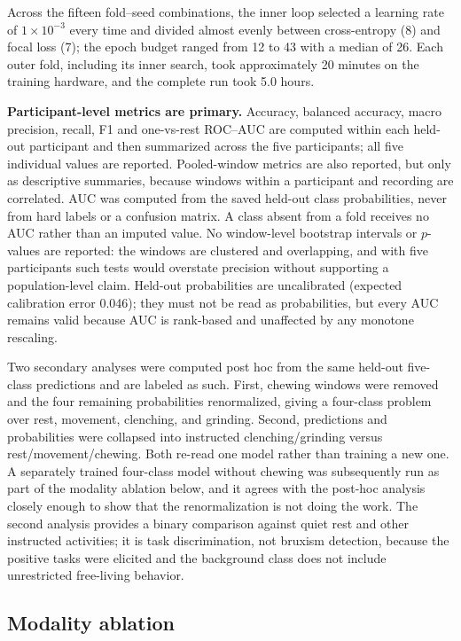 \documentclass[pdflatex,sn-nature,iicol]{sn-jnl}
\begin{document}
Across the fifteen fold--seed combinations, the inner loop selected a learning rate of $1\times10^{-3}$ every time and divided almost evenly between cross-entropy (8) and focal loss (7); the epoch budget ranged from 12 to 43 with a median of 26. Each outer fold, including its inner search, took approximately 20 minutes on the training hardware, and the complete run took 5.0 hours.

\textbf{Participant-level metrics are primary.} Accuracy, balanced accuracy, macro precision, recall, F1 and one-vs-rest ROC--AUC are computed within each held-out participant and then summarized across the five participants; all five individual values are reported. Pooled-window metrics are also reported, but only as descriptive summaries, because windows within a participant and recording are correlated. AUC was computed from the saved held-out class probabilities, never from hard labels or a confusion matrix. A class absent from a fold receives no AUC rather than an imputed value. No window-level bootstrap intervals or $p$-values are reported: the windows are clustered and overlapping, and with five participants such tests would overstate precision without supporting a population-level claim. Held-out probabilities are uncalibrated (expected calibration error 0.046); they must not be read as probabilities, but every AUC remains valid because AUC is rank-based and unaffected by any monotone rescaling.

Two secondary analyses were computed post hoc from the same held-out five-class predictions and are labeled as such. First, chewing windows were removed and the four remaining probabilities renormalized, giving a four-class problem over rest, movement, clenching, and grinding. Second, predictions and probabilities were collapsed into instructed clenching/grinding versus rest/movement/chewing. Both re-read one model rather than training a new one. A separately trained four-class model without chewing was subsequently run as part of the modality ablation below, and it agrees with the post-hoc analysis closely enough to show that the renormalization is not doing the work. The second analysis provides a binary comparison against quiet rest and other instructed activities; it is task discrimination, not bruxism detection, because the positive tasks were elicited and the background class does not include unrestricted free-living behavior.

\subsection{Modality ablation}
\end{document}
